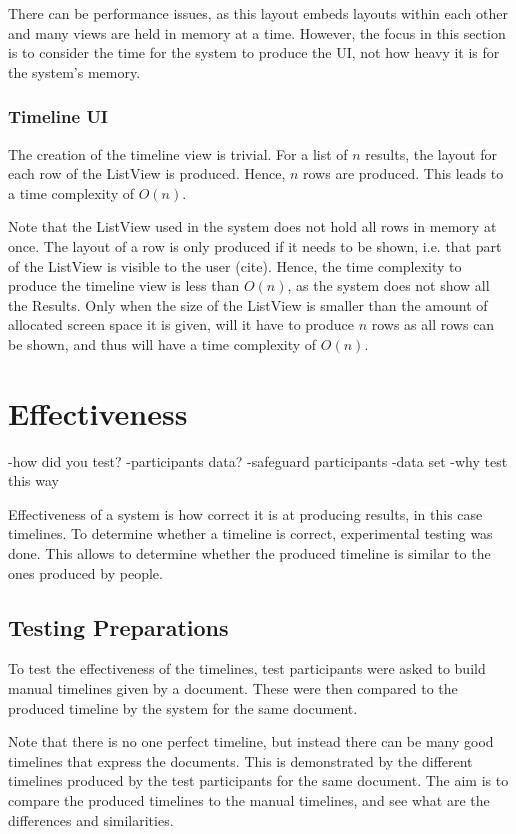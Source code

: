 \par There can be performance issues, as this layout embeds layouts within each other and many views are held in memory at a time. However, the focus in this section is to consider the time for the system to produce the UI, not how heavy it is for the system's memory.

\subsubsection{Timeline UI}
\par The creation of the timeline view is trivial. For a list of $n$ results, the layout for each row of the ListView is produced. Hence, $n$ rows are produced. This leads to a time complexity of $O(n)$.

\par Note that the ListView used in the system does not hold all rows in memory at once. The layout of a row is only produced if it needs to be shown, i.e. that part of the ListView is visible to the user (cite). Hence, the time complexity to produce the timeline view is less than $O(n)$, as the system does not show all the Results. Only when the size of the ListView is smaller than the amount of allocated screen space it is given, will it have to produce $n$ rows as all rows can be shown, and thus will have a time complexity of $O(n)$.

\section{Effectiveness}
-how did you test?
-participants data?
-safeguard participants
-data set
-why test this way
\par Effectiveness of a system is how correct it is at producing results, in this case timelines. To determine whether a timeline is correct, experimental testing was done. This allows to determine whether the produced timeline is similar to the ones produced by people.

\subsection{Testing Preparations}
\par To test the effectiveness of the timelines, test participants were asked to build manual timelines given by a document. These were then compared to the produced timeline by the system for the same document.

\par Note that there is no one perfect timeline, but instead there can be many good timelines that express the documents. This is demonstrated by the different timelines produced by the test participants for the same document.  The aim is to compare the produced timelines to the manual timelines, and see what are the differences and similarities.

